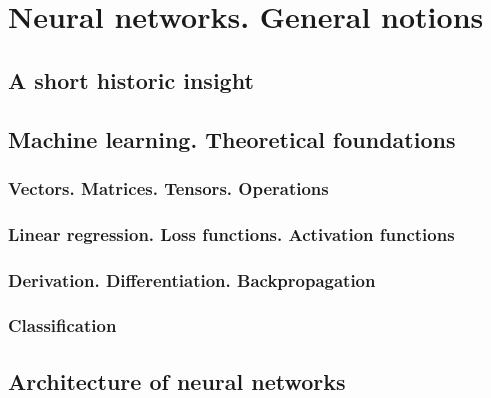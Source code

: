 \chapter{Neural networks. General notions}
\label{chap:ch3}



\section{A short historic insight}
\label{sec:ch3sec1}


\section{Machine learning. Theoretical foundations}
\label{subsec:ch3sec2}


\subsection{Vectors. Matrices. Tensors. Operations}
\label{subsec:ch3sec2subsec1}


\subsection{Linear regression. Loss functions. Activation functions}
\label{subsec:ch3sec2subsec2}


\subsection{Derivation. Differentiation. Backpropagation}
\label{subsec:ch3sec2subsec3}


\subsection{Classification}
\label{subsec:ch3sec2subsec4}


\section{Architecture of neural networks}
\label{subsec:ch3sec3}
